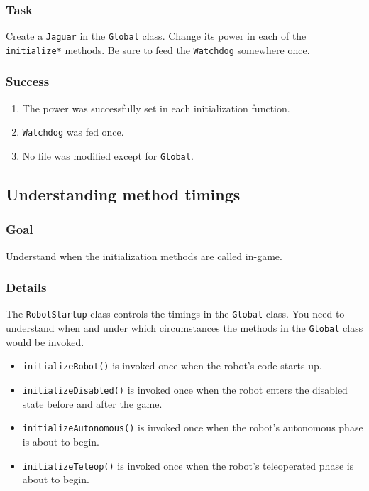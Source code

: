 \documentclass[a4paper]{article}
\begin{document}
\subsubsection{Task} Create a \lstinline{Jaguar} in the \lstinline{Global} class. Change its power in each of the \lstinline{initialize*} methods. Be sure to feed the \lstinline{Watchdog} somewhere once.
\subsubsection{Success} \begin{enumerate}\item{The power was successfully set in each initialization function.}\item{\lstinline{Watchdog} was fed once.}\item{No file was modified except for \lstinline{Global}.}\end{enumerate}

\pagebreak\subsection{Understanding method timings}
\subsubsection{Goal} Understand when the initialization methods are called in-game.
\subsubsection{Details} The \lstinline{RobotStartup} class controls the timings in the \lstinline{Global} class. You need to understand when and under which circumstances the methods in the \lstinline{Global} class would be invoked. \begin{itemize}\item{\lstinline{initializeRobot()} is invoked once when the robot's code starts up.}\item{\lstinline{initializeDisabled()} is invoked once when the robot enters the disabled state before and after the game.}\item{\lstinline{initializeAutonomous()} is invoked once when the robot's autonomous phase is about to begin.}\item{\lstinline{initializeTeleop()} is invoked once when the robot's teleoperated phase is about to begin.}\end{itemize}
\end{document}
